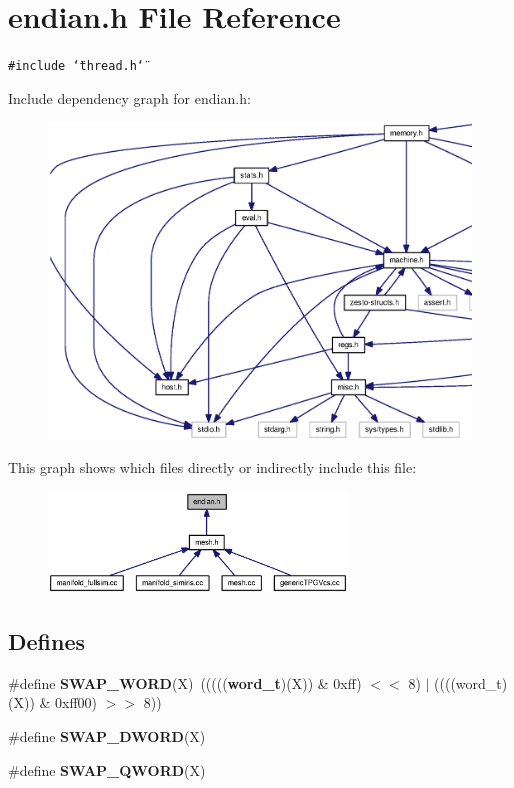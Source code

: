 \section{endian.h File Reference}
\label{endian_8h}
{\tt \#include \char`\"{}thread.h\char`\"{}}\par


Include dependency graph for endian.h:\nopagebreak
\begin{figure}[H]
\begin{center}
\leavevmode
\includegraphics[width=420pt]{endian_8h__incl}
\end{center}
\end{figure}


This graph shows which files directly or indirectly include this file:\nopagebreak
\begin{figure}[H]
\begin{center}
\leavevmode
\includegraphics[width=225pt]{endian_8h__dep__incl}
\end{center}
\end{figure}
\subsection*{Defines}
\begin{CompactItemize}
\item 
\#define {\bf SWAP\_\-WORD}(X)~((((({\bf word\_\-t})(X)) \& 0xff) $<$$<$ 8) $|$ ((((word\_\-t)(X)) \& 0xff00) $>$$>$ 8))
\item 
\#define {\bf SWAP\_\-DWORD}(X)
\item 
\#define {\bf SWAP\_\-QWORD}(X)
\end{CompactItemize}
